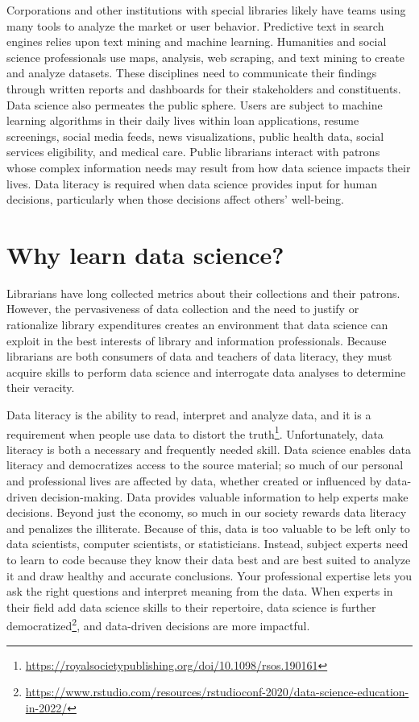 \documentclass[
  krantz2]{krantz}
\begin{document}
Corporations and other institutions with special libraries likely have teams using many tools to analyze the market or user behavior. Predictive text in search engines relies upon text mining and machine learning. Humanities and social science professionals use maps, analysis, web scraping, and text mining to create and analyze datasets. These disciplines need to communicate their findings through written reports and dashboards for their stakeholders and constituents. Data science also permeates the public sphere. Users are subject to machine learning algorithms in their daily lives within loan applications, resume screenings, social media feeds, news visualizations, public health data, social services eligibility, and medical care. Public librarians interact with patrons whose complex information needs may result from how data science impacts their lives. Data literacy is required when data science provides input for human decisions, particularly when those decisions affect others' well-being.

\hypertarget{learn-ds}{%
\section{Why learn data science?}\label{learn-ds}}

Librarians have long collected metrics about their collections and their patrons. However, the pervasiveness of data collection and the need to justify or rationalize library expenditures creates an environment that data science can exploit in the best interests of library and information professionals. Because librarians are both consumers of data and teachers of data literacy, they must acquire skills to perform data science and interrogate data analyses to determine their veracity.

Data literacy is the ability to read, interpret and analyze data, and it is a requirement when people use data to distort the truth\footnote{\url{https://royalsocietypublishing.org/doi/10.1098/rsos.190161}}. Unfortunately, data literacy is both a necessary and frequently needed skill. Data science enables data literacy and democratizes access to the source material; so much of our personal and professional lives are affected by data, whether created or influenced by data-driven decision-making. Data provides valuable information to help experts make decisions. Beyond just the economy, so much in our society rewards data literacy and penalizes the illiterate. Because of this, data is too valuable to be left only to data scientists, computer scientists, or statisticians. Instead, subject experts need to learn to code because they know their data best and are best suited to analyze it and draw healthy and accurate conclusions. Your professional expertise lets you ask the right questions and interpret meaning from the data. When experts in their field add data science skills to their repertoire, data science is further democratized\footnote{\url{https://www.rstudio.com/resources/rstudioconf-2020/data-science-education-in-2022/}}, and data-driven decisions are more impactful.
\end{document}
